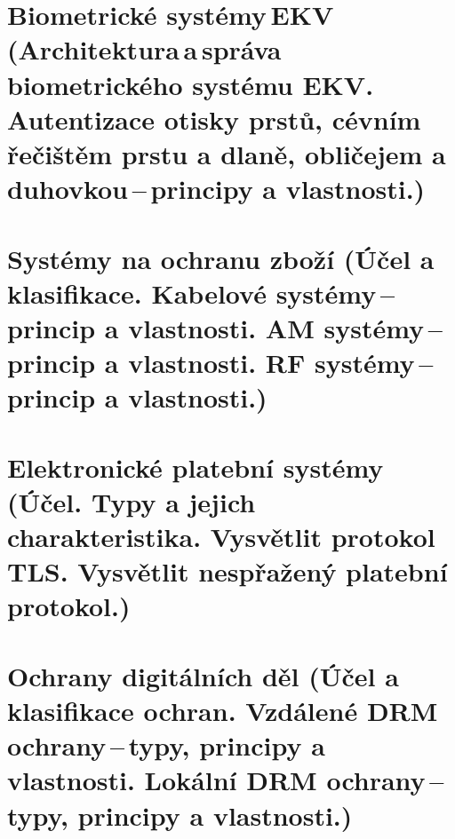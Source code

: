 \newpage
\section[Biometrické systémy EKV (Architektura a správa biometrického systému EKV. Autentizace otisky prstů, cévním řečištěm prstu a dlaně, obličejem a duhovkou\,--\,principy a vlastnosti.)]{Biometrické systémy\,EKV\,(Architektura\,a\,správa biometrického systému EKV. Autentizace otisky prstů, cévním řečištěm prstu a dlaně, obličejem a duhovkou\,--\,principy a vlastnosti.)}

\newpage
\section{Systémy na ochranu zboží (Účel a klasifikace. Kabelové systémy\,--\,princip a vlastnosti. AM systémy\,--\,princip a vlastnosti. RF systémy\,--\,princip a vlastnosti.)}

\newpage
\section{Elektronické platební systémy (Účel. Typy a jejich charakteristika. Vysvětlit protokol TLS. Vysvětlit nespřažený platební protokol.)}

\newpage
\section{Ochrany digitálních děl (Účel a klasifikace ochran. Vzdálené DRM ochrany\,--\,typy, principy a vlastnosti. Lokální DRM ochrany\,--\,typy, principy a vlastnosti.)}